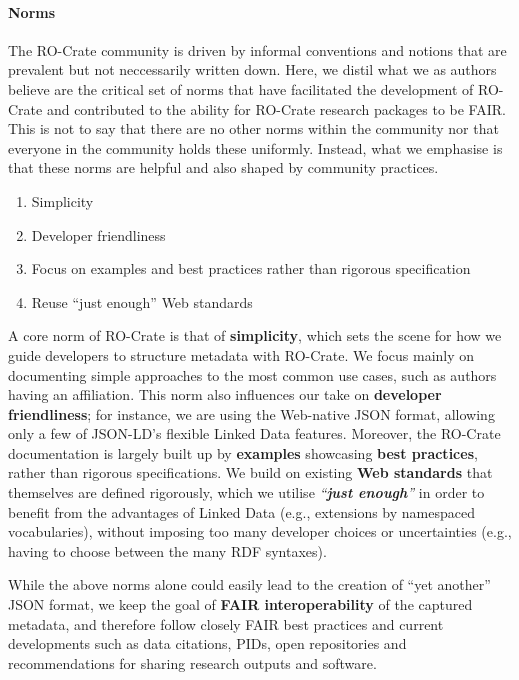 \hypertarget{norms}{%
\paragraph{Norms}\label{norms}}

The RO-Crate community is driven by informal conventions and notions
that are prevalent but not neccessarily written down. Here, we distil
what we as authors believe are the critical set of norms that have
facilitated the development of RO-Crate and contributed to the ability
for RO-Crate research packages to be FAIR. This is not to say that there
are no other norms within the community nor that everyone in the
community holds these uniformly. Instead, what we emphasise is that
these norms are helpful and also shaped by community practices.

\begin{enumerate}
\def\labelenumi{\arabic{enumi}.}
\tightlist
\item
  Simplicity
\item
  Developer friendliness
\item
  Focus on examples and best practices rather than rigorous
  specification
\item
  Reuse ``just enough'' Web standards
\end{enumerate}

A core norm of RO-Crate is that of \textbf{simplicity}, which sets the
scene for how we guide developers to structure metadata with RO-Crate.
We focus mainly on documenting simple approaches to the most common use
cases, such as authors having an affiliation. This norm also influences
our take on \textbf{developer friendliness}; for instance, we are using
the Web-native JSON format, allowing only a few of JSON-LD's flexible
Linked Data features. Moreover, the RO-Crate documentation is largely
built up by \textbf{examples} showcasing \textbf{best practices}, rather
than rigorous specifications. We build on existing \textbf{Web
standards} that themselves are defined rigorously, which we utilise
\emph{``\textbf{just enough}''} in order to benefit from the advantages
of Linked Data (e.g., extensions by namespaced vocabularies), without
imposing too many developer choices or uncertainties (e.g., having to
choose between the many RDF syntaxes).

While the above norms alone could easily lead to the creation of ``yet
another'' JSON format, we keep the goal of \textbf{FAIR
interoperability} of the captured metadata, and therefore follow closely
FAIR best practices and current developments such as data citations,
PIDs, open repositories and recommendations for sharing research outputs
and software.

